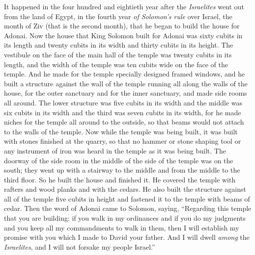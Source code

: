 \begin{biblechapter} %
 It happened in the four hundred and eightieth year after the \textit{Israelites} went out from the land of Egypt, in the fourth year \textit{of Solomon’s rule} over Israel, the month of Ziv (that is the second month), that he began to build the house for Adonai.
\verse Now the house that King Solomon built for Adonai was sixty cubits in its length and twenty cubits in its width and thirty cubits in its height.
\verse The vestibule on the face of the main hall of the temple was twenty cubits in its length, and the width of the temple was ten cubits wide on the face of the temple.
\verse And he made for the temple specially designed framed windows,
\verse and he built a structure against the wall of the temple running all along the walls of the house, for the outer sanctuary and for the inner sanctuary, and made side rooms all around.
\verse The lower structure was five cubits in its width and the middle was six cubits in its width and the third was seven cubits in its width, for he made niches for the temple all around to the outside, so that beams would not attach to the walls of the temple.
\verse Now while the temple was being built, it was built with stones finished at the quarry, so that no hammer or stone shaping tool or any instrument of iron was heard in the temple as it was being built.
\verse The doorway of the side room in the middle of the side of the temple was on the south; they went up with a stairway to the middle and from the middle to the third floor.
\verse So he built the house and finished it. He covered the temple with rafters and wood planks and with the cedars.
\verse He also built the structure against all of the temple five cubits in height and fastened it to the temple with beams of cedar.
\verse Then the word of Adonai came to Solomon, saying,
\verse “Regarding this temple that you are building: if you walk in my ordinances and if you do my judgments and you keep all my commandments to walk in them, then I will establish my promise with you which I made to David your father.
\verse And I will dwell \textit{among} the \textit{Israelites}, and I will not forsake my people Israel.”

\end{biblechapter}
